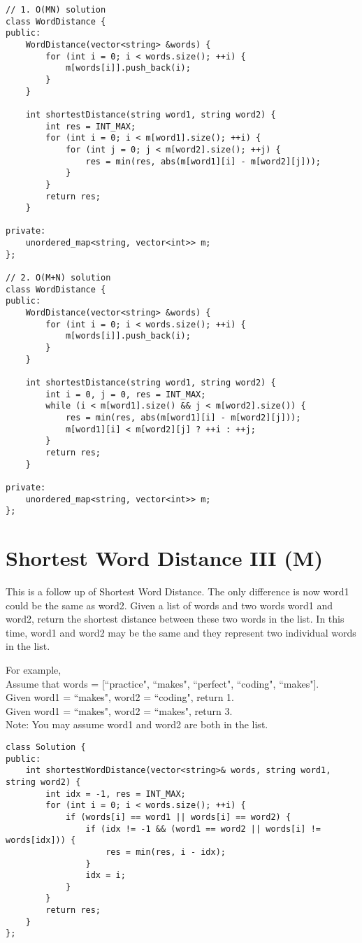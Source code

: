 \begin{lstlisting}
// 1. O(MN) solution
class WordDistance {
public:
    WordDistance(vector<string> &words) {
        for (int i = 0; i < words.size(); ++i) {
            m[words[i]].push_back(i);
        }
    }
    
    int shortestDistance(string word1, string word2) {
        int res = INT_MAX;
        for (int i = 0; i < m[word1].size(); ++i) {
            for (int j = 0; j < m[word2].size(); ++j) {
                res = min(res, abs(m[word1][i] - m[word2][j]));
            }
        }
        return res;
    }

private:
    unordered_map<string, vector<int>> m;
};

// 2. O(M+N) solution
class WordDistance {
public:
    WordDistance(vector<string> &words) {
        for (int i = 0; i < words.size(); ++i) {
            m[words[i]].push_back(i);
        }
    }
    
    int shortestDistance(string word1, string word2) {
        int i = 0, j = 0, res = INT_MAX;
        while (i < m[word1].size() && j < m[word2].size()) {
            res = min(res, abs(m[word1][i] - m[word2][j]));
            m[word1][i] < m[word2][j] ? ++i : ++j;    
        }
        return res;
    }

private:
    unordered_map<string, vector<int>> m;
};
\end{lstlisting}


\section{Shortest Word Distance III (M)}
This is a follow up of Shortest Word Distance. The only difference is now word1 could be the same as word2. Given a list of words and two words word1 and word2, return the shortest distance between these two words in the list. In this time, word1 and word2 may be the same and they represent two individual words in the list.

For example,\\
Assume that words = [``practice", ``makes", ``perfect", ``coding", ``makes"].\\
Given word1 = ``makes", word2 = ``coding", return 1.\\
Given word1 = ``makes", word2 = ``makes", return 3.\\

Note:
You may assume word1 and word2 are both in the list. 

\begin{lstlisting}
class Solution {
public:
    int shortestWordDistance(vector<string>& words, string word1, string word2) {
        int idx = -1, res = INT_MAX;
        for (int i = 0; i < words.size(); ++i) {
            if (words[i] == word1 || words[i] == word2) {
                if (idx != -1 && (word1 == word2 || words[i] != words[idx])) {
                    res = min(res, i - idx);
                }
                idx = i;
            }
        }
        return res;
    }
};
\end{lstlisting}


